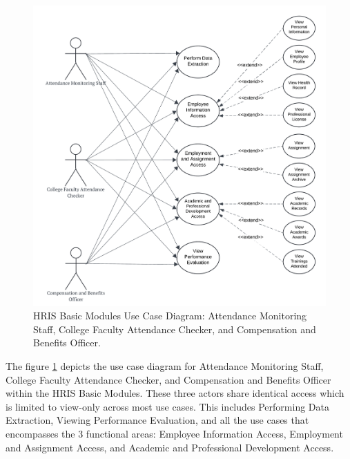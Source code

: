     \begin{figure}[H]
        \centering
        \includegraphics[width=0.9\linewidth]{figures/images/diagrams/usecase/use-case-basic-2.png}
        \caption{HRIS Basic Modules Use Case Diagram: Attendance Monitoring Staff, College Faculty Attendance Checker, and Compensation and Benefits Officer.}
        \label{fig:use-case-basic-2}
    \end{figure}

    The figure \ref{fig:use-case-basic-2} depicts the use case diagram for Attendance Monitoring Staff, College Faculty Attendance Checker, and Compensation and Benefits Officer within the HRIS Basic Modules. These three actors share identical access which is limited to view-only across most use cases. This includes Performing Data Extraction, Viewing Performance Evaluation, and all the use cases that encompasses the 3 functional areas: Employee Information Access, Employment and Assignment Access, and Academic and Professional Development Access. 

